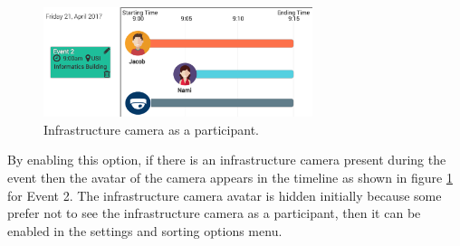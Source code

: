 \documentclass[mscthesis]{usiinfthesis}
\begin{document}
\begin{figure}[!ht]
  \centering
  \includegraphics[width=0.7\textwidth]{Infra}
  \caption{Infrastructure camera as a participant.}
  \label{fig7}
\end{figure}

By enabling this option, if there is an infrastructure camera present during the event then the avatar of the camera appears in the timeline as shown in figure \ref{fig7} for Event 2. The infrastructure camera avatar is hidden initially because some prefer not to see the infrastructure camera as a participant, then it can be enabled in the settings and sorting options menu.
\end{document}
